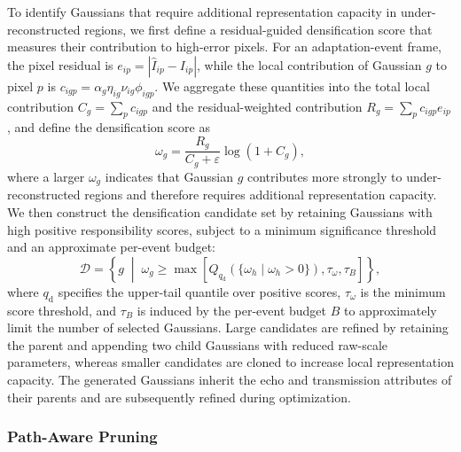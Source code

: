 To identify Gaussians that require additional representation capacity in
under-reconstructed regions, we first define a residual-guided densification
score that measures their contribution to high-error pixels. For an
adaptation-event frame, the pixel residual is
$e_{ip}=|\widehat I_{ip}-I_{ip}|$, while the local contribution of Gaussian
$g$ to pixel $p$ is
$c_{igp}=\alpha_g\eta_{ig}\nu_{ig}\phi_{igp}$. We aggregate these quantities
into the total local contribution
$C_g=\sum_p c_{igp}$ and the residual-weighted contribution
$R_g=\sum_p c_{igp}e_{ip}$, and define the densification score as
\begin{equation}
\omega_g
=
\frac{R_g}{C_g+\varepsilon}
\log(1+C_g),
\label{eq:contribution-aware-densification}
\end{equation}
where a larger $\omega_g$ indicates that Gaussian $g$ contributes more strongly
to under-reconstructed regions and therefore requires additional
representation capacity. We
then construct the densification candidate set by retaining Gaussians with
high positive responsibility scores, subject to a minimum significance
threshold and an approximate per-event budget:
\begin{equation}
\mathcal D
=
\left\{
g
\;\middle|\;
\omega_g
\geq
\max
\left[
Q_{q_{\mathrm d}}
\left(
\{\omega_h\mid\omega_h>0\}
\right),
\tau_{\omega},
\tau_B
\right]
\right\},
\label{eq:densification-selection}
\end{equation}
where $q_{\mathrm d}$ specifies the upper-tail quantile over positive scores,
$\tau_{\omega}$ is the minimum score threshold, and $\tau_B$ is induced by
the per-event budget $B$ to approximately limit the number of selected
Gaussians. Large candidates are refined by retaining the parent and appending
two child Gaussians with reduced raw-scale parameters, whereas smaller
candidates are cloned to increase local representation capacity. The generated
Gaussians inherit the echo and transmission attributes of their parents and
are subsequently refined during optimization.

\subsubsection{Path-Aware Pruning}

